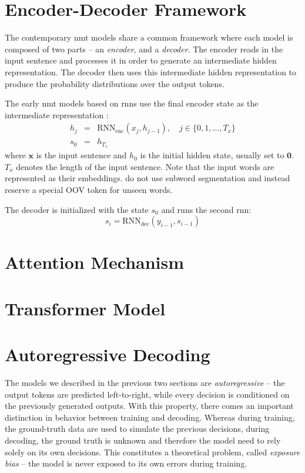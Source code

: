 \section{Encoder-Decoder Framework}
\label{sec:encdec}

The contemporary \gls{nmt} models share a common framework where each model is composed
of two parts -- an \emph{encoder}, and a \emph{decoder}. The encoder reads in the input
sentence and processes it in order to generate an intermediate hidden representation.
The decoder then uses this intermediate hidden representation to produce the probability
distributions over the output tokens.

The early \gls{nmt} models based on \glspl{rnn} use the final encoder state as the
intermediate representation \citep{sutskever2014sequence}:
%
\begin{eqnarray}
h_j & = &  \mathrm{RNN}_{\text{enc}}(x_j, h_{j-1}), \quad j \in \{0, 1, \ldots, T_x \} \\
s_0 & = & h_{T_x}
\end{eqnarray}
%
where $\mathbf{x}$ is the input sentence and $h_0$ is the initial hidden state, usually set to $\mathbf{0}$. $T_x$ denotes the length of the input sentence. Note that the input words are represented as their embeddings. \citet{sutskever2014sequence} do not use subword segmentation and
instead reserve a special OOV token for unseen words.

The decoder is initialized with the state $s_0$ and runs the second \gls{rnn}:
\begin{equation}
s_i = \mathrm{RNN}_{\text{dec}}(y_{i-1}, s_{i-1})
\end{equation}



\section{Attention Mechanism}
\label{sec:attention}


\section{Transformer Model}
\label{sec:transformer}

\section{Autoregressive Decoding}
\label{sec:training-vs-inference}

The models we described in the previous two sections are \emph{autoregressive} -- 
the output tokens are predicted left-to-right, while every decision is conditioned
on the previously generated outputs. With this property, there comes an important distinction
in behavior between training and decoding. Whereas during training, the ground-truth data
are used to simulate the previous decisions, during decoding, the ground truth is unknown
and therefore the model need to rely solely on its own decisions. This constitutes a theoretical 
problem, called \emph{exposure bias} -- the model is never exposed to its own errors during 
training.

